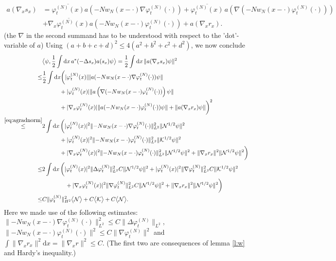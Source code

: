 \documentclass[11pt,a4paper]{scrartcl}
\newcommand{\di}{\textrm{d}}		%
\newcommand{\Ncal}{\mathcal{N}}		%
\newcommand{\Kcal}{\mathcal{K}}		%
\newcommand{\scal}[2]{\big<#1,#2\big>} %
\newcommand{\cc}[1]{\overline{#1}}	%
\newcommand{\norm}[1]{\lVert#1\rVert}	%
\newcommand{\ev}[1]{\big<#1\big>}	%
\newcommand{\ph}{\varphi_t^{(N)}}	%
\newcommand{\eqr}[1]{\eqref{eq:#1}}			%
\begin{document}
\begin{align*}
 a(\nabla_x s_x) & = \cc{\ph(x)} a(-Nw_N(x-\cdot)\nabla\ph(\cdot)) + \cc{\ph(x)}\,a\left(\nabla(-N w_N(x-\cdot)\ph(\cdot))\right) \\
 & + \cc{\nabla_x \ph(x)} a(-Nw_N(x-\cdot)\ph(\cdot)) + a(\nabla_x r_x).
\end{align*}
(the $\nabla$ in the second summand has to be understood with respect to the 'dot'-variable of $a$)
Using $(a+b+c+d)^2 \leq 4(a^2+b^2+c^2+d^2)$, we now conclude
\begin{equation}
\label{eq:bound2B}
\begin{split}
 & \scal{\psi}{\frac{1}{2}\int \di x\, a^\ast(-\Delta s_x) a(s_x)\psi} = \frac{1}{2}\int \di x\, \norm{a(\nabla_x s_x)\psi}^2 \\
\leq & \frac{1}{2} \int \di x \bigg( \lvert \ph(x)\rvert \norm{a(-Nw_N(x-\cdot)\nabla\ph(\cdot))\psi} \\
& \qquad\quad + \lvert \ph(x)\rvert \norm{a\left(\nabla(-N w_N(x-\cdot)\ph(\cdot))\right)\psi} \\
& \qquad\quad + \lvert \nabla_x \ph(x)\rvert \norm{a(-Nw_N(x-\cdot)\ph(\cdot))\psi} + \norm{a(\nabla_x r_x)\psi}  \bigg)^2 \\
\stackrel{\eqr{agradnorm}}{\leq} & 2\int \di x\, \bigg( \lvert \ph(x)\rvert^2 \norm{-N w_N(x-\cdot)\nabla\ph(\cdot)}_{L^2}^2 \norm{\Ncal^{1/2}\psi}^2  \\
& \qquad\quad+ \lvert \ph(x)\rvert^2 \norm{-Nw_N(x-\cdot) \ph(\cdot)}_{L^2}^2 \norm{\Kcal^{1/2}\psi}^2  \\
& \qquad\quad + \lvert \nabla_x \ph(x)\rvert^2 \norm{-N w_N(x-\cdot) \ph(\cdot)}_{L^2}^2 \norm{\Ncal^{1/2}\psi}^2 + \norm{\nabla_x r_x}^2 \norm{\Ncal^{1/2}\psi}^2 \bigg) \\
\leq & 2 \int \di x\, \bigg( \lvert \ph(x)\rvert^2 \norm{\Delta \ph}_{L^2}^2 C \norm{\Ncal^{1/2}\psi}^2 + \lvert \ph(x)\rvert^2 \norm{\nabla \ph}_{L^2}^2 C \norm{\Kcal^{1/2}\psi}^2 \\
& \qquad\qquad + \lvert \nabla_x \ph(x)\rvert^2 \norm{\nabla \ph}_{L^2}^2 C \norm{\Ncal^{1/2}\psi}^2 + \norm{\nabla_x r_x}^2 \norm{\Ncal^{1/2}\psi}^2 \bigg)\\
\leq & C \norm{\ph}_{H^2}^2 \ev{\Ncal} + C\ev{\Kcal} + C\ev{\Ncal}.
\end{split} 
\end{equation}
Here we made use of the following estimates: $\norm{-N w_N(x-\cdot) \nabla\ph(\cdot)}_{L^2}^2 \leq C\norm{\Delta \ph}_{L^2}$, $\norm{-N w_N(x-\cdot)\ph(\cdot)}^2 \leq C \norm{\nabla \ph}^2$  and $\int \norm{\nabla_x r_x}^2 \di x= \norm{\nabla_x r}^2 \leq C$. (The first two are consequences of lemma \ref{l:w} and Hardy's inequality.)\newline
\end{document}
